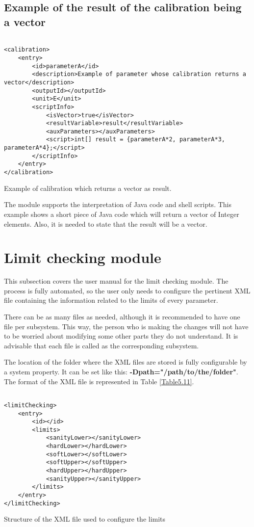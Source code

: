 \subsection{Example of the result of the calibration being a vector}

 \begin{table}[H]
\lstset{language=XML}
\begin{lstlisting}

<calibration>
	<entry>
		<id>parameterA</id>
		<description>Example of parameter whose calibration returns a vector</description>
		<outputId></outputId>
		<unit>E</unit>
		<scriptInfo>
			<isVector>true</isVector>
			<resultVariable>result</resultVariable>
			<auxParameters></auxParameters>
			<script>int[] result = {parameterA*2, parameterA*3, parameterA*4};</script>
		</scriptInfo>
	</entry>
</calibration>
\end{lstlisting}
\caption{Example of calibration which returns a vector as result.} 
\label{Table5.10}
\end{table}

The module supports the interpretation of Java code and shell scripts. This example shows a short piece of Java code which will return a vector of Integer elements. Also, it is needed to state that the result will be a vector.




\section{Limit checking module}
This subsection covers the user manual for the limit checking module. The process is fully automated, so the user only needs to configure the pertinent XML file containing the information related to the limits of every parameter. 

There can be as many files as needed, although it is recommended to have one file per subsystem. This way, the person who is making the changes will not have to be worried about modifying some other parts they do not understand. It is advisable that each file is called as the corresponding subsystem.

The location of the folder where the XML files are stored is fully configurable by a system property. It can be set like this: \textbf{-Dpath="/path/to/the/folder"}.
\newpage
The format of the XML file is represented in Table \ref{Table5.11}.
\begin{table}[H]
\lstset{language=XML}
\begin{lstlisting}

<limitChecking>
	<entry>
		<id></id>
		<limits>
			<sanityLower></sanityLower>
			<hardLower></hardLower>
			<softLower></softLower>
			<softUpper></softUpper>
			<hardUpper></hardUpper>
			<sanityUpper></sanityUpper>
		</limits>
	</entry>
</limitChecking>
\end{lstlisting}
\caption{Structure of the XML file used to configure the limits}
\label{Table5.11}
\end{table}

